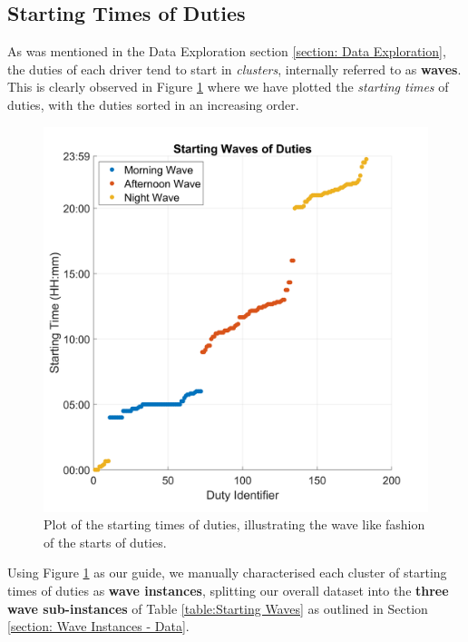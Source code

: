 
\subsection{Starting Times of Duties}
\label{subsection: Appendix Starting times}
As was mentioned in the Data Exploration section \ref{section: Data Exploration}, the duties of each driver tend to start in \textit{clusters}, internally referred to as \textbf{waves}. This is clearly observed in Figure \ref{fig:starting time} where we have plotted the \textit{starting times} of duties, with the duties sorted in an increasing order. 



\begin{figure}[ht]
\begin{center}
\includegraphics[width=0.46\linewidth]{appendix/Appendix-Start-wave.png}
    
\end{center}
   \caption{Plot of the starting times of duties, illustrating the wave like fashion of the starts of duties.}
\label{fig:starting time}
\end{figure}

\vspace{\baselineskip}
\noindent
Using Figure \ref{fig:starting time} as our guide, we manually characterised each cluster of starting times of duties as \textbf{wave instances}, splitting our overall dataset into the \textbf{three wave sub-instances} of Table \ref{table:Starting Waves} as outlined in Section \ref{section: Wave Instances - Data}.  


